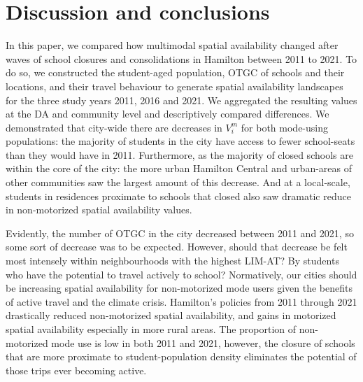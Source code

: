 \documentclass[
default
]{sn-jnl}
\begin{document}
\section{Discussion and conclusions}\label{discussion-and-conclusions}

In this paper, we compared how multimodal spatial availability changed
after waves of school closures and consolidations in Hamilton between
2011 to 2021. To do so, we constructed the student-aged population, OTGC
of schools and their locations, and their travel behaviour to generate
spatial availability landscapes for the three study years 2011, 2016 and
2021. We aggregated the resulting values at the DA and community level
and descriptively compared differences. We demonstrated that city-wide
there are decreases in \(V_i^m\) for both mode-using populations: the
majority of students in the city have access to fewer school-seats than
they would have in 2011. Furthermore, as the majority of closed schools
are within the core of the city: the more urban Hamilton Central and
urban-areas of other communities saw the largest amount of this
decrease. And at a local-scale, students in residences proximate to
schools that closed also saw dramatic reduce in non-motorized spatial
availability values.

Evidently, the number of OTGC in the city decreased between 2011 and
2021, so some sort of decrease was to be expected. However, should that
decrease be felt most intensely within neighbourhoods with the highest
LIM-AT? By students who have the potential to travel actively to school?
Normatively, our cities should be increasing spatial availability for
non-motorized mode users given the benefits of active travel and the
climate crisis. Hamilton's policies from 2011 through 2021 drastically
reduced non-motorized spatial availability, and gains in motorized
spatial availability especially in more rural areas. The proportion of
non-motorized mode use is low in both 2011 and 2021, however, the
closure of schools that are more proximate to student-population density
eliminates the potential of those trips ever becoming active.
\end{document}
